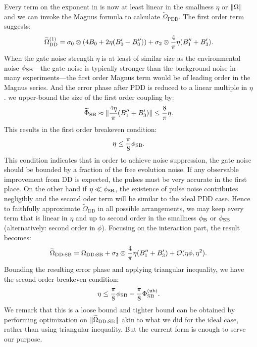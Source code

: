 \documentclass[pra,reprint,superscriptaddress]{revtex4-2}
\newcommand{\wt}[1]{\widetilde{#1}}
\newcommand{\rDD}{\mathrm{DD}}
\begin{document}
Every term on the exponent in   is now at least linear in the smallness $\eta$ or $\Vert {\Omega} \Vert$ and we can invoke the Magnus formula to calculate $\widetilde\Omega_\mathrm{PDD}$. 
The first order term suggests:
\begin{equation}\label{eq:PDDnp-firstorder}
 \wt\Omega_\rDD\up{1}= \sigma_0 \otimes (4B_0 + 2\eta( B'_0 + B''_0)) 
+ \sigma_2 \otimes \frac{4}{\pi}\eta(B_1''+B_3').
\end{equation}
When the gate noise strength $\eta$ is at least of similar size as the environmental noise $\phi_{\mathrm{SB}}$---the gate noise is typically stronger than the background noise in many experiments---the first order Magnus term would be of leading order in the Magnus series. And the error phase after PDD is reduced to a linear multiple in $\eta$. 
 we upper-bound the size of the first order coupling by:
\begin{equation}
 \wt\Phi_\rSB \approx \norm{ \frac{4\eta}{\pi}(B_1''+B_3')} \le \frac{8}{\pi}\eta.
\end{equation}
This results in the first order breakeven condition:
\begin{equation}
 \eta \le \frac{\pi}{8} \phi_{\mathrm{SB}}.
\end{equation}
This condition indicates that in order to achieve noise suppression, the gate noise should be bounded by a fraction of the free evolution noise. If any observable improvement from DD is expected, the pulses must be very accurate in the first place.   On the other hand if $\eta\ll \phi_{\mathrm{SB}}$, the existence of pulse noise contributes negligibly and the second oder term will be similar to the ideal PDD case. Hence to faithfully approximate $\wt\Omega_\rDD$
in all possible arrangements, we may keep every term that is linear in $\eta$ and up to second order in the smallness $\phi_{\mathrm{B}}$ or $\phi_{\mathrm{SB}}$ (alternatively: second order in $\phi$). Focusing on the interaction part, the result becomes:
\begin{equation}
 \wt\Omega_{\rDD:\rSB} = \Omega_{\rDD:\rSB} +\sigma_2 \otimes \frac{4}{\pi}\eta(B_1''+B_3') + \cO(\eta\phi,\eta^2).
\end{equation}
Bounding the resulting error phase and applying triangular inequality, we have the second order breakeven condition:
\begin{equation}\label{eq:npulses-breakeven2}
   \eta \le \frac{\pi}{8} \phi_{\mathrm{SB}} - \frac{\pi}{8}\Phi_{\mathrm{SB}}^{(\mathrm{ub})}.
\end{equation}
We remark that this is a loose bound and tighter bound can be obtained by performing optimization on $\norm{\wt\Omega_{\rDD:\rSB}}$ akin to what we did for the ideal case, rather than using triangular inequality. But the current form is enough to serve our purpose. 
\end{document}
